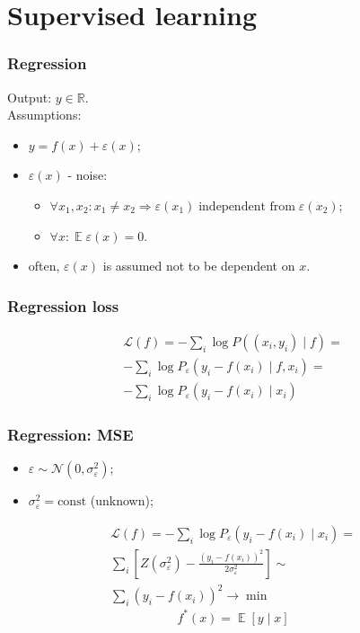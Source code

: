 \documentclass[mathserif, aspectratio=43]{beamer}
\DeclareMathOperator*{\E}{\mathbb{E}}
\begin{document}
\section{Supervised learning}



\begin{frame}[fragile]
\frametitle{Regression}
Output: $y \in \mathbb{R}$.
\\[5mm]
Assumptions:
\begin{itemize}
\item $y = f(x) + \varepsilon(x)$;
\item $\varepsilon(x)$ - noise:
\begin{itemize}
\item $\forall x_1, x_2: x_1 \neq x_2 \Rightarrow \varepsilon(x_1)\;\text{independent from}\; \varepsilon(x_2)$;
\item $\forall x: \E \varepsilon(x) = 0$.
\end{itemize}

\item often, $\varepsilon(x)$ is assumed not to be dependent on $x$.

\end{itemize}

\end{frame}


\begin{frame}[fragile]
\frametitle{Regression loss}
\begin{multline*}
  \mathcal{L}(f) = -\sum_i \log P((x_i, y_i) \mid f) = \\
    -\sum_i \log P_\varepsilon(y_i - f(x_i) \mid f, x_i) =\\
    -\sum_i \log P_\varepsilon(y_i - f(x_i) \mid x_i)
\end{multline*}

\end{frame}


\begin{frame}[fragile]
\frametitle{Regression: MSE}
\begin{itemize}
\item $\varepsilon \sim \mathcal{N}(0, \sigma^2_\varepsilon)$;
\item $\sigma^2_\varepsilon = \mathrm{const}$ (unknown);
\end{itemize}
\begin{multline*}
  \mathcal{L}(f) = -\sum_i \log P_\varepsilon(y_i - f(x_i) \mid x_i) = \\
    \sum_i \left[ Z(\sigma^2_\varepsilon) - \frac{(y_i - f(x_i))^2}{2 \sigma^2_\varepsilon}\right] \sim \\
    \sum_i (y_i - f(x_i))^2 \to \min
\end{multline*}
\begin{equation*}
  f^*(x) = \E\left[ y \mid x \right]
\end{equation*}

\end{frame}
\end{document}
